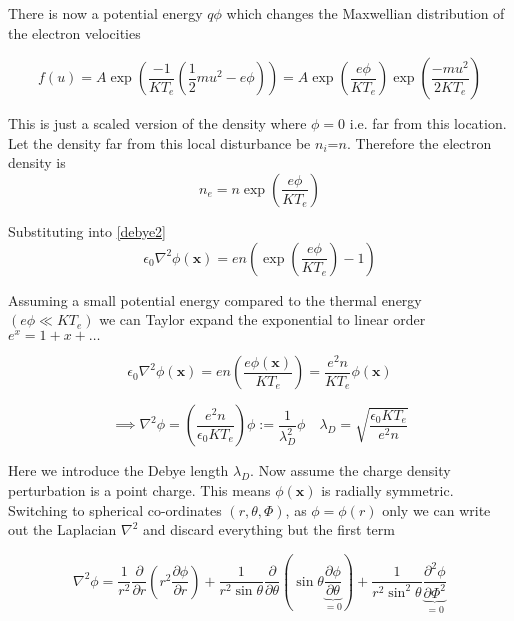 There is now a potential energy $q\phi$ which changes the Maxwellian distribution of the electron velocities

\begin{equation}
	f(u)=A\exp\left(\frac{-1}{KT_e}\left(\frac{1}{2}mu^2-e\phi\right)\right)=A\exp\left(\frac{e\phi}{KT_e}\right)\exp\left(\frac{-mu^2}{2KT_e}\right)
\end{equation}

This is just a scaled version of the density where $\phi=0$ i.e. far from this location. Let the density far from this local disturbance be $n_i$=$n$. Therefore the electron density is
\begin{equation}
	n_e = n\exp\left(\frac{e\phi}{KT_e}\right)
\end{equation}

Substituting into \eqref{debye2}
\begin{equation}
	\epsilon_0 \nabla^2 \phi(\bm{x}) = en\left(\exp\left(\frac{e\phi}{KT_e}\right) - 1\right)
\end{equation}

Assuming a small potential energy compared to the thermal energy $(e\phi \ll KT_e)$ we can Taylor expand the exponential to linear order $e^x=1+x+\dots$

\begin{equation}
	\epsilon_0 \nabla^2 \phi(\bm{x}) = en\left(\frac{e\phi(\bm{x})}{KT_e}\right)=\frac{e^2 n}{KT_e}\phi(\bm{x})
\end{equation}

\begin{equation}\label{debye3}
	\implies \nabla^2 \phi = \left(\frac{e^2 n}{\epsilon_0 KT_e}\right)\phi := \frac{1}{\lambda_D^2}\phi \quad \lambda_D = \sqrt{\frac{\epsilon_0 KT_e}{e^2 n}}
\end{equation}

Here we introduce the Debye length $\lambda_D$. Now assume the charge density perturbation is a point charge. This means $\phi(\bm{x})$ is radially symmetric. Switching to spherical co-ordinates $(r, \theta, \Phi)$, as $\phi=\phi(r)$ only we can write out the Laplacian $\nabla^2$ and discard everything but the first term

\begin{equation}
	\nabla^2 \phi = \frac{1}{r^2}\frac{\partial}{\partial r}\left(r^2 \frac{\partial \phi}{\partial r}\right) + {\frac{1}{r^2 \sin \theta} \frac{\partial}{\partial \theta}\left(\sin \theta \underbrace{\frac{\partial \phi}{\partial \theta}}_{=0}\right)} + {\frac{1}{r^2\sin^2\theta} \underbrace{\frac{\partial^2 \phi}{\partial \Phi^2}}_{=0}}
\end{equation}

